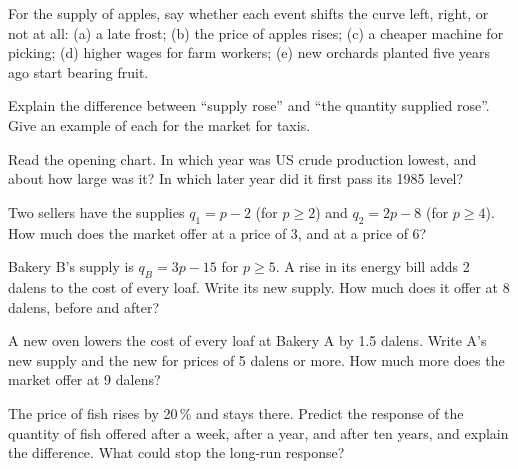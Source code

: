 \begin{exercise}[$\star$]\label{exo:g10:supply:2}
For the supply of apples, say whether each event shifts the curve left, right, or not at all: (a) a late frost; (b) the price of apples
rises; (c) a cheaper machine for picking; (d) higher wages for farm workers; (e) new orchards planted five years ago start bearing fruit.
\end{exercise}

\begin{exercise}[$\star$]\label{exo:g10:supply:3}
Explain the difference between ``supply rose'' and ``the quantity supplied rose''. Give an example of each for the market for taxis.
\end{exercise}

\begin{exercise}[$\star$]\label{exo:g10:supply:4}
Read the opening chart. In which year was US crude production lowest, and about how large was it? In which later year did it first
pass its 1985 level?
\end{exercise}

\begin{exercise}[$\star$]\label{exo:g10:supply:5}
Two sellers have the supplies $q_1 = p - 2$ (for $p \ge 2$) and $q_2 = 2p - 8$ (for $p \ge 4$). How much does the market offer at a price
of 3, and at a price of 6?
\end{exercise}

\begin{exercise}[$\star\star$]\label{exo:g10:supply:6}
Bakery B's supply is $q_B = 3p - 15$ for $p \ge 5$. A rise in its energy bill adds 2 dalens to the cost of every loaf. Write
its new supply. How much does it offer at 8 dalens, before and after?
\end{exercise}

\begin{exercise}[$\star\star$]\label{exo:g10:supply:7}
A new oven lowers the cost of every loaf at Bakery A by 1.5 dalens. Write A's new supply and the new  for prices of
5 dalens or more. How much more does the market offer at 9 dalens?
\end{exercise}

\begin{exercise}[$\star\star$]\label{exo:g10:supply:8}
The price of fish rises by 20\,\% and stays there. Predict the response of the quantity of fish offered after a week, after a year, and
after ten years, and explain the difference. What could stop the long-run response?
\end{exercise}

